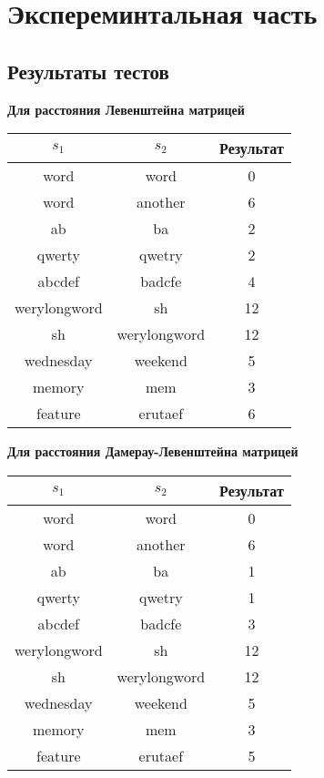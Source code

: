﻿\documentclass[a4paper,12pt]{article}
\begin{document}
    \newpage
    \section{Экспереминтальная часть}
    \subsection{Результаты тестов}

    \textbf{Для расстояния Левенштейна матрицей}

    \begin{tabular}{|c|c|c|}
        \hline
        $s_1$ & $s_2$ & Результат \\
        \hline
        word & word & 0 \\
        \hline
        word & another & 6 \\
        \hline
        ab & ba & 2 \\
        \hline
        qwerty & qwetry & 2 \\
        \hline
        abcdef & badcfe & 4 \\
        \hline
        werylongword & sh & 12 \\
        \hline
        sh & werylongword & 12 \\
        \hline
        wednesday & weekend & 5 \\
        \hline
        memory & mem & 3 \\
        \hline
        feature & erutaef & 6 \\
        \hline
    \end{tabular}

    \hfill

    \hfill

    \textbf{Для расстояния Дамерау-Левенштейна матрицей}

    \begin{tabular}{|c|c|c|}
        \hline
        $s_1$ & $s_2$ & Результат \\
        \hline
        word & word & 0 \\
        \hline
        word & another & 6 \\
        \hline
        ab & ba & 1 \\
        \hline
        qwerty & qwetry & 1 \\
        \hline
        abcdef & badcfe & 3 \\
        \hline
        werylongword & sh & 12 \\
        \hline
        sh & werylongword & 12 \\
        \hline
        wednesday & weekend & 5 \\
        \hline
        memory & mem & 3 \\
        \hline
        feature & erutaef & 5 \\
        \hline
    \end{tabular}
\end{document}

